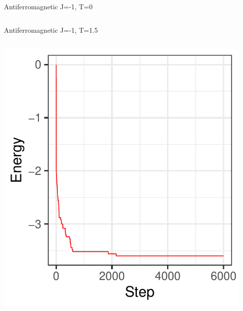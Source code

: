 \documentclass{beamer}
\begin{document}
\begin{frame}{Antiferromagnetic J=-1, T=0}
\begin{columns}
\begin{column}{0.5\textwidth}
\begin{center}
     \end{center}
\end{column}
\end{columns}
\end{frame}


\begin{frame}{Antiferromagnetic J=-1, T=1.5}
\begin{columns}
\begin{column}{0.5\textwidth}
    \begin{center}
     \includegraphics[width=\textwidth]{Pic/J-1_60_2500_T=1.5_ENERGY.pdf}
     \end{center}
\end{column}
\begin{column}{0.5\textwidth}
    \begin{center}

\end{center}
\end{column}
\end{columns}
\end{frame}
\end{document}
